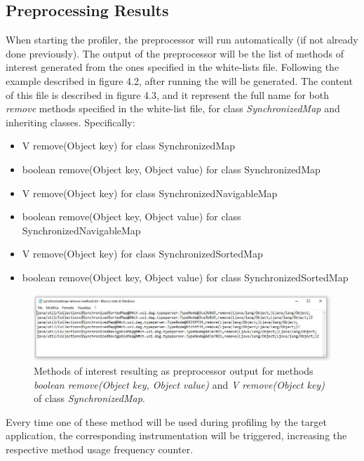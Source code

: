 \documentclass[]{usiinfthesis}
\begin{document}
\subsection{Preprocessing Results}
When starting the profiler, the preprocessor will run automatically (if not already done previously). The output of the preprocessor will be the list of methods of interest generated from the ones specified in the white-lists file. Following the example described in figure 4.2, after running the will be generated. The content of this file is described in figure 4.3, and it represent the full name for both \textit{remove} methods specified in the white-list file, for class \textit{SynchronizedMap} and inheriting classes. Specifically:
\begin{itemize}
    \item V remove(Object key) for class SynchronizedMap
    \item boolean remove(Object key, Object value) for class SynchronizedMap
    \item V remove(Object key) for class SynchronizedNavigableMap
    \item boolean remove(Object key, Object value) for class SynchronizedNavigableMap
    \item V remove(Object key) for class SynchronizedSortedMap
    \item boolean remove(Object key, Object value) for class SynchronizedSortedMap
\end{itemize}

\vspace{0.5cm}
\begin{figure}[h]
    \centering
    \includegraphics[scale=0.45]{Immagini/outputmethods.JPG} 
    \caption{Methods of interest resulting as preprocessor output for methods \textit{boolean remove(Object key, Object value)} and \textit{V remove(Object key)} of class \textit{SynchronizedMap}.}
    \label{fig:fig1}
\end{figure}
\vspace{0.5cm}


\newline
\noindent
Every time one of these method will be used during profiling by the target application, the corresponding instrumentation will be triggered, increasing the respective method usage frequency counter.
\end{document}
